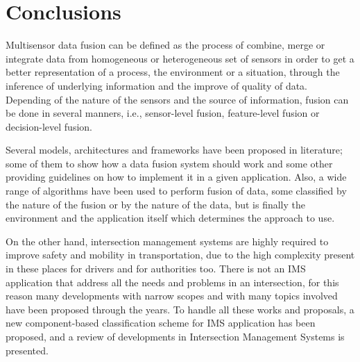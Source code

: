 \section{Conclusions}

Multisensor data fusion can be defined as the process of combine, merge or integrate data from homogeneous or heterogeneous set of sensors in order to get a better representation of a process, the environment or a situation, through the inference of underlying information and the improve of quality of data. Depending of the nature of the sensors and the source of information, fusion can be done in several manners, i.e., sensor-level fusion, feature-level fusion or decision-level fusion.

Several models, architectures and frameworks have been proposed in literature; some of them to show how a data fusion system should work and some other providing guidelines on how to implement it in a given application. Also, a wide range of algorithms have been used to perform fusion of data, some classified by the nature of the fusion or by the nature of the data, but is finally the environment and the application itself which determines the approach to use.

On the other hand, intersection management systems are highly required to improve safety and mobility in transportation, due to the high complexity present in these places for drivers and for authorities too. There is not an IMS application that address all the needs and problems in an intersection, for this reason many developments with narrow scopes and with many topics involved have been proposed through the years. To handle all these works and proposals, a new component-based classification scheme for IMS application has been proposed, and a review of developments in Intersection Management Systems is presented.


%